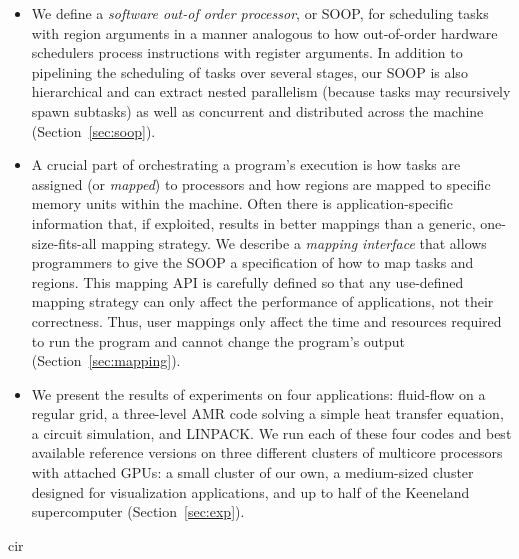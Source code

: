 \documentclass[conference]{IEEEtran}
\begin{document}
\begin{itemize}

\item We define a {\em software out-of order processor}, or SOOP, for scheduling tasks with region arguments in a manner
analogous to how out-of-order hardware schedulers process instructions with register arguments.  In addition to pipelining
the scheduling of tasks over several stages, our SOOP is also hierarchical and can extract nested parallelism (because tasks may recursively spawn subtasks) as well as concurrent and distributed across the machine (Section~\ref{sec:soop}). 

\item A crucial part of orchestrating a program's execution is how
tasks are assigned (or {\em mapped}) to processors and how regions are
mapped to specific memory units within the machine.  Often there is
application-specific information that, if exploited, results in better
mappings than a generic, one-size-fits-all mapping strategy.  We describe
a {\em mapping interface} that allows programmers to give the SOOP a specification
of how to map tasks and regions.  This mapping API is carefully defined so that
any use-defined mapping strategy can only affect the performance of applications,
not their correctness.  Thus, user mappings only affect the time and resources required
to run the program and cannot change the program's output (Section~\ref{sec:mapping}).

\item We present the results of experiments on four applications: fluid-flow on a regular grid,
a three-level AMR code solving a simple heat transfer equation, a circuit simulation,
and LINPACK.  We run each of these four codes and best available reference versions on three different
clusters of multicore processors with attached GPUs: a small cluster of our own, a medium-sized cluster designed for visualization applications, and up to half of the Keeneland supercomputer (Section~\ref{sec:exp}).


\end{itemize}




cir





%




\end{document}
